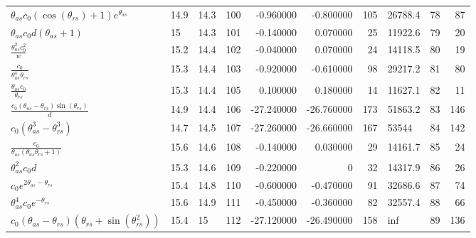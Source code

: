 \begin{tabularx}{\textwidth}{lllrrrrlrr}
$ \theta_{as} c_{0} \left(\cos{\left(\theta_{rs} \right)} + 1\right) e^{\theta_{as}} $  &  14.9  &  14.3  &  100  &  -0.960000  &  -0.800000  &  105  &  26788.4  &  78\phantom{.000000}  &  87\phantom{.000000}  \\ 
$ \theta_{as} c_{0} d \left(\theta_{as} + 1\right) $  &  15\phantom{.0}  &  14.3  &  101  &  -0.140000  &  0.070000  &  25  &  11922.6  &  79\phantom{.000000}  &  20\phantom{.000000}  \\ 
$ \displaystyle\frac{\theta_{as}^{2} c_{0}^{2}}{w} $  &  15.2  &  14.4  &  102  &  -0.040000  &  0.070000  &  24  &  14118.5  &  80\phantom{.000000}  &  19\phantom{.000000}  \\ 
$ \displaystyle\frac{c_{0}}{\theta_{as}^{4} \theta_{rs}} $  &  15.3  &  14.4  &  103  &  -0.920000  &  -0.610000  &  98  &  29217.2  &  81\phantom{.000000}  &  80\phantom{.000000}  \\ 
$ \displaystyle\frac{\theta_{as} c_{0}}{\theta_{rs}} $  &  15.3  &  14.4  &  105  &  0.100000  &  0.180000  &  14  &  11627.1  &  82\phantom{.000000}  &  11\phantom{.000000}  \\ 
$ \displaystyle\frac{c_{0} \left(\theta_{as} - \theta_{rs}\right) \sin{\left(\theta_{rs} \right)}}{d} $  &  14.9  &  14.4  &  106  &  -27.240000  &  -26.760000  &  173  &  51863.2  &  83\phantom{.000000}  &  146\phantom{.000000}  \\ 
$ c_{0} \left(\theta_{as}^{3} - \theta_{rs}^{3}\right) $  &  14.7  &  14.5  &  107  &  -27.260000  &  -26.660000  &  167  &  53544\phantom{.0}  &  84\phantom{.000000}  &  142\phantom{.000000}  \\ 
$ \displaystyle\frac{c_{0}}{\theta_{as} \left(\theta_{as} \theta_{rs} + 1\right)} $  &  15.6  &  14.6  &  108  &  -0.140000  &  0.030000  &  29  &  14161.7  &  85\phantom{.000000}  &  24\phantom{.000000}  \\ 
$ \theta_{as}^{2} c_{0} d $  &  15.3  &  14.6  &  109  &  -0.220000  &  0\phantom{.000000}  &  32  &  14317.9  &  86\phantom{.000000}  &  26\phantom{.000000}  \\ 
$ c_{0} e^{2 \theta_{as} - \theta_{rs}} $  &  15.4  &  14.8  &  110  &  -0.600000  &  -0.470000  &  91  &  32686.6  &  87\phantom{.000000}  &  74\phantom{.000000}  \\ 
$ \theta_{as}^{4} c_{0} e^{- \theta_{rs}} $  &  15.6  &  14.9  &  111  &  -0.450000  &  -0.360000  &  82  &  32557.4  &  88\phantom{.000000}  &  66\phantom{.000000}  \\ 
$ c_{0} \left(\theta_{as} - \theta_{rs}\right) \left(\theta_{rs} + \sin{\left(\theta_{rs}^{2} \right)}\right) $  &  15.4  &  15\phantom{.0}  &  112  &  -27.120000  &  -26.490000  &  158  &  inf  &  89\phantom{.000000}  &  136\phantom{.000000}  \\ 

\end{tabularx}
